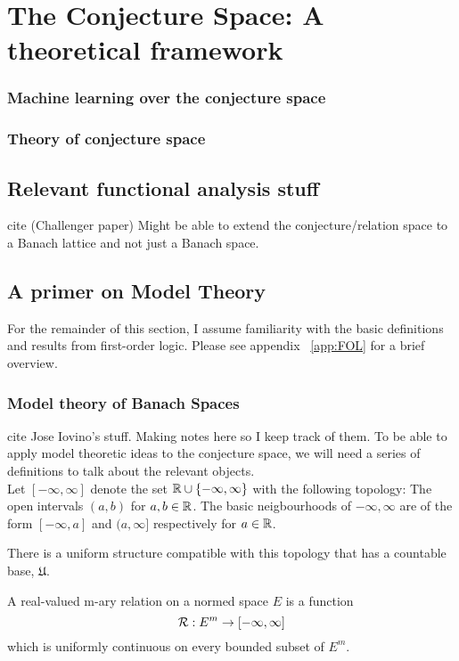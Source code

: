\chapter{The Conjecture Space: A theoretical framework} 
\subsection{Machine learning over the conjecture space}
\subsection{Theory of conjecture space}
\section{Relevant functional analysis stuff}
cite (Challenger paper) Might be able to extend the conjecture/relation space to a Banach lattice and not just a Banach space.
\section{A primer on Model Theory}
For the remainder of this section, I assume familiarity with the basic definitions and results from first-order logic. Please see appendix ~\ref{app:FOL} for a brief overview.
\subsection{Model theory of Banach Spaces}
cite Jose Iovino's stuff. Making notes here so I keep track of them.
To be able to apply model theoretic ideas to the conjecture space, we will need a series of definitions to talk about the relevant objects.\\

Let $[-\infty, \infty]$ denote the set $\mathbb{R}\cup\{-\infty, \infty\}$ with the following topology: The open intervals $(a,b)$ for $a,b\in \mathbb{R}$. The basic neigbourhoods of $-\infty, \infty$ are of the form $[-\infty, a]$ and $(a,\infty]$ respectively for $a\in \mathbb{R}$.
\begin{remark}
    There is a uniform structure compatible with this topology that has a countable base, $\mathfrak{U}$.
\end{remark}

\begin{definition}
    A real-valued m-ary relation on a normed space $E$ is a function
    \begin{equation*}
        \mathcal{R}:E^m\rightarrow [-\infty, \infty]
    \end{equation*}
    which is uniformly continuous on every bounded subset of $E^m$.    
\end{definition}


